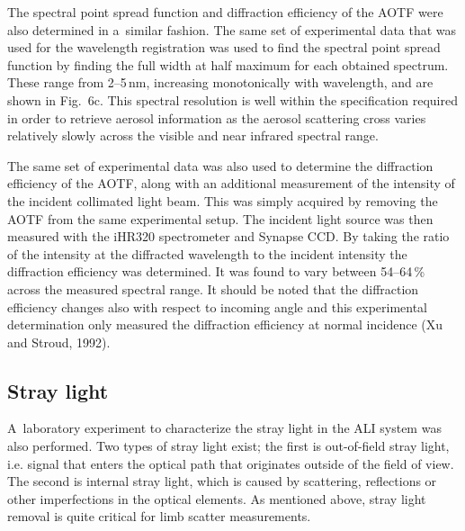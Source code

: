 \documentclass[amtd, online, hvmath]{copernicus}
\begin{document}
The spectral point spread function and diffraction efficiency of the
AOTF were also determined in a~similar fashion. The same set of
experimental data that was used for the wavelength registration was
used to find the spectral point spread function by finding the full
width at half maximum for each obtained spectrum. These range from
2--5\,\unit{nm}, increasing monotonically with wavelength, and are
shown in Fig.~6c. This spectral resolution is well within the
specification required in order to retrieve aerosol information as the
aerosol scattering cross varies relatively slowly across the visible
and near infrared spectral range.

The same set of experimental data was also used to determine the
diffraction efficiency of the AOTF, along with an additional
measurement of the intensity of the incident collimated light
beam. This was simply acquired by removing the AOTF from the same
experimental setup. The incident light source was then measured with
the iHR320 spectrometer and Synapse CCD. By taking the ratio of the
intensity at the diffracted wavelength to the incident intensity the
diffraction efficiency was determined. It was found to vary between
54--64\,{\%} across the measured spectral range. It should be noted
that the diffraction efficiency changes also with respect to incoming
angle and this experimental determination only measured the
diffraction efficiency at normal incidence (Xu and Stroud, 1992).

\subsection{Stray light}

A~laboratory experiment to characterize the stray light in the ALI
system was also performed. Two types of stray light exist; the first
is out-of-field stray light, i.e. signal that enters the optical path
that originates outside of the field of view. The second is internal
stray light, which is caused by scattering, reflections or other
imperfections in the optical elements. As mentioned above, stray light
removal is quite critical for limb scatter measurements.
\end{document}

